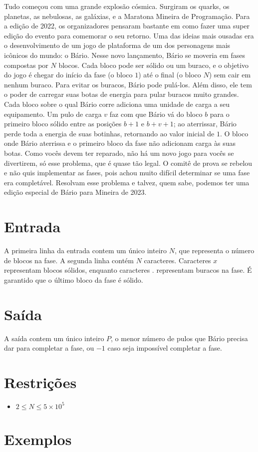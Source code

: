 Tudo começou com uma grande explosão cósmica. Surgiram os quarks, os planetas, as nebulosas, as galáxias, e a Maratona Mineira de Programação.
Para a edição de 2022, os organizadores pensaram bastante em como fazer uma super edição do evento para comemorar o seu retorno. Uma das ideias mais
ousadas era o desenvolvimento de um jogo de plataforma de um dos personagens mais icônicos do mundo: o Bário.
Nesse novo lançamento, Bário se moveria em fases compostas por $N$ blocos.
Cada bloco pode ser sólido ou um buraco, e o objetivo do jogo é chegar do início da fase (o bloco $1$) até o final (o bloco $N$) sem cair em nenhum buraco.
Para evitar os buracos, Bário pode pulá-los.
Além disso, ele tem o poder de carregar suas botas de energia para pular buracos muito grandes.
Cada bloco sobre o qual Bário corre adiciona uma unidade de carga a seu equipamento.
Um pulo de carga $v$ faz com que Bário vá do bloco $b$ para o primeiro bloco sólido entre as posições $b+1$ e $b+v+1$;
ao aterrissar, Bário perde toda a energia de suas botinhas, retornando ao valor inicial de $1$.
O bloco onde Bário aterrissa e o primeiro bloco da fase não adicionam carga às suas botas.
Como vocês devem ter reparado, não há um novo jogo para vocês se divertirem, só esse problema, que é quase tão legal.
O comitê de prova se rebelou e não quis implementar as fases, pois achou muito difícil determinar se uma fase era completável.
Resolvam esse problema e talvez, quem sabe, podemos ter uma edição especial de Bário para Mineira de 2023.



\section*{Entrada}

A primeira linha da entrada contem um único inteiro $N$, que representa o número de blocos na fase.
A segunda linha contém $N$ caracteres. Caracteres $x$ representam blocos sólidos, enquanto caracteres $.$ representam buracos na fase. É garantido que o último bloco da fase é sólido.

\section*{Saída}

A saída contem um único inteiro $P$, o menor número de pulos que Bário precisa dar para completar a fase, ou $-1$ caso seja impossível completar a fase.

\section*{Restrições}

\begin{itemize}
\item $2 \leq N \leq 5 \times 10^5$
\end{itemize}


\section*{Exemplos}

\exemplo
